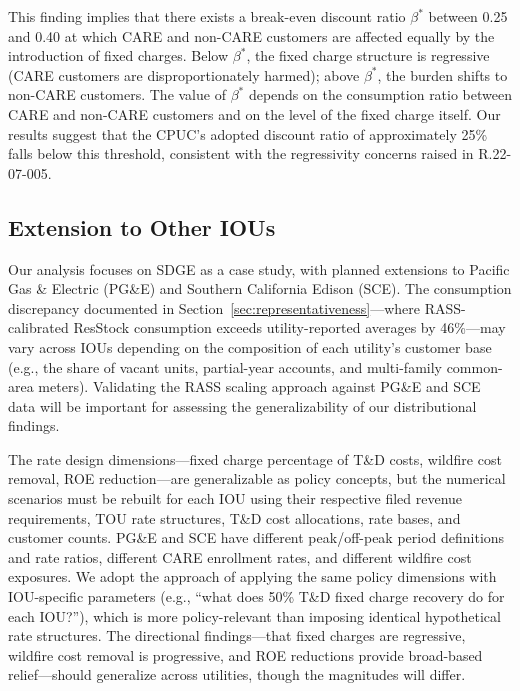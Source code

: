 \documentclass[12pt]{article}
\begin{document}
This finding implies that there exists a break-even discount ratio $\beta^*$ between 0.25 and 0.40 at which CARE and non-CARE customers are affected equally by the introduction of fixed charges. Below $\beta^*$, the fixed charge structure is regressive (CARE customers are disproportionately harmed); above $\beta^*$, the burden shifts to non-CARE customers. The value of $\beta^*$ depends on the consumption ratio between CARE and non-CARE customers and on the level of the fixed charge itself. Our results suggest that the CPUC's adopted discount ratio of approximately 25\% falls below this threshold, consistent with the regressivity concerns raised in R.22-07-005.

\subsection{Extension to Other IOUs}
\label{sec:iou_extension}

Our analysis focuses on SDGE as a case study, with planned extensions to Pacific Gas \& Electric (PG\&E) and Southern California Edison (SCE). The consumption discrepancy documented in Section~\ref{sec:representativeness}---where RASS-calibrated ResStock consumption exceeds utility-reported averages by 46\%---may vary across IOUs depending on the composition of each utility's customer base (e.g., the share of vacant units, partial-year accounts, and multi-family common-area meters). Validating the RASS scaling approach against PG\&E and SCE data will be important for assessing the generalizability of our distributional findings.

The rate design dimensions---fixed charge percentage of T\&D costs, wildfire cost removal, ROE reduction---are generalizable as policy concepts, but the numerical scenarios must be rebuilt for each IOU using their respective filed revenue requirements, TOU rate structures, T\&D cost allocations, rate bases, and customer counts. PG\&E and SCE have different peak/off-peak period definitions and rate ratios, different CARE enrollment rates, and different wildfire cost exposures. We adopt the approach of applying the same policy dimensions with IOU-specific parameters (e.g., ``what does 50\% T\&D fixed charge recovery do for each IOU?''), which is more policy-relevant than imposing identical hypothetical rate structures. The directional findings---that fixed charges are regressive, wildfire cost removal is progressive, and ROE reductions provide broad-based relief---should generalize across utilities, though the magnitudes will differ.
\end{document}
